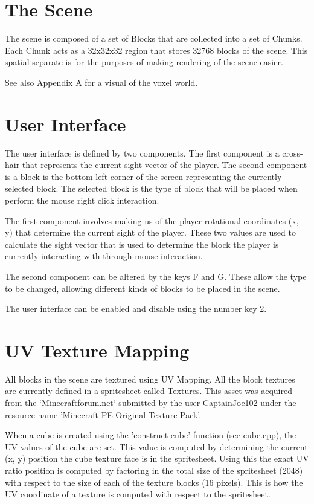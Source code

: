 \documentclass{book}
\begin{document}
\section{The Scene}
The scene is composed of a set of Blocks that are collected into a set of Chunks.  Each Chunk acts as a 32x32x32 region that stores 32768 blocks of the scene.  This spatial separate is for the purposes of making rendering of the scene easier. 
  
See also Appendix A for a visual of the voxel world.
  
\section{User Interface}
The user interface is defined by two components.  The first component is a cross-hair that represents the current sight vector of the player.  The second component is a block is the bottom-left corner of the screen representing the currently selected block.  The selected block is the type of block that will be placed when perform the mouse right click interaction.
    
The first component involves making us of the player rotational coordinates (x, y) that determine the current sight of the player.  These two values are used to calculate the sight vector that is used to determine the block the player is currently interacting with through mouse interaction.
    
The second component can be altered by the keys F and G.  These allow the type to be changed, allowing different kinds of blocks to be placed in the scene.
    
The user interface can be enabled and disable using the number key 2. 
    
\section{UV Texture Mapping}
All blocks in the scene are textured using UV Mapping.  All the block textures are currently defined in a spritesheet called Textures.  This asset was acquired from the `Minecraftforum.net`
submitted by the user CaptainJoe102 under the resource name 'Minecraft PE Original Texture Pack'.
    
When a cube is created using the 'construct-cube' function (see cube.cpp), the UV values of the cube are set.  This value is computed by determining the current (x, y) position the cube texture face is in the spritesheet.  Using this the exact UV ratio position is computed by factoring in the total size of the spritesheet (2048) with respect to the size of each of the texture blocks (16 pixels).  This is how the UV coordinate of a texture is computed with respect to the spritesheet.
    
\end{document}
